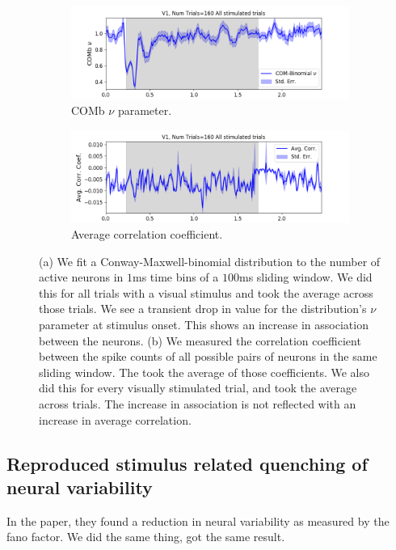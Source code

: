 \documentclass[a4paper,12pt]{article}
\theoremstyle{definition}
\begin{document}
  \begin{figure}[h]
    \begin{subfigure}[h]{\linewidth}
      \includegraphics[width=\linewidth]{figures/v1_1ms_comb_nu_all_stimulated_trials.png}
      \caption{COMb $\nu$ parameter.}
      \label{fig:comb_nu_parameter}
    \end{subfigure}
    \begin{subfigure}[h]{\linewidth}
      \includegraphics[width=\linewidth]{figures/v1_1ms_corr_avg_all_stimulated_trials.png}
      \caption{Average correlation coefficient.}
      \label{fig:avg_corr_coef}
    \end{subfigure}
    \caption{(a) We fit a Conway-Maxwell-binomial distribution to the number of active neurons in $1$ms time bins of a $100$ms sliding window. We did this for all trials with a visual stimulus and took the average across those trials. We see a transient drop in value for the distribution's $\nu$ parameter at stimulus onset. This shows an increase in association between the neurons. (b) We measured the correlation coefficient between the spike counts of all possible pairs of neurons in the same sliding window. The took the average of those coefficients. We also did this for every visually stimulated trial, and took the average across trials. The increase in association is not reflected with an increase in average correlation.}
    \label{fig:comb_nu_and_corr}
  \end{figure}

  \newpage

  \subsection{Reproduced stimulus related quenching of neural variability}
  In the paper, they found a reduction in neural variability as measured by the fano factor. We did the same thing, got the same result.
\end{document}
